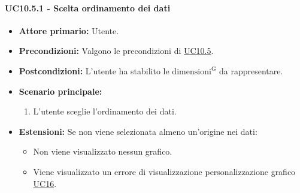 \paragraph{UC10.5.1 - Scelta ordinamento dei dati}
\label{sec:UC10.5.1}
    \begin{itemize}
        \item \textbf{Attore primario:} Utente.
        \item \textbf{Precondizioni:} Valgono le precondizioni di \hyperref[sec:UC10.5]{UC10.5}.
	    \item \textbf{Postcondizioni:} L'utente ha stabilito le ${\mathrm{dimensioni^{G}}}$ da rappresentare.
	    \item \textbf{Scenario principale:}
	    \begin{enumerate}
	    		\item L'utente sceglie l'ordinamento dei dati.
		\end{enumerate}
		\item \textbf{Estensioni:} Se non viene selezionata almeno un'origine nei dati:
              \begin{itemize}
                  \item Non viene visualizzato nessun grafico.
                  \item Viene visualizzato un errore di visualizzazione personalizzazione grafico \hyperref[sec:UC16 - Errore di personalizzazione]{UC16}.
              \end{itemize}
    \end{itemize}


\newpage

